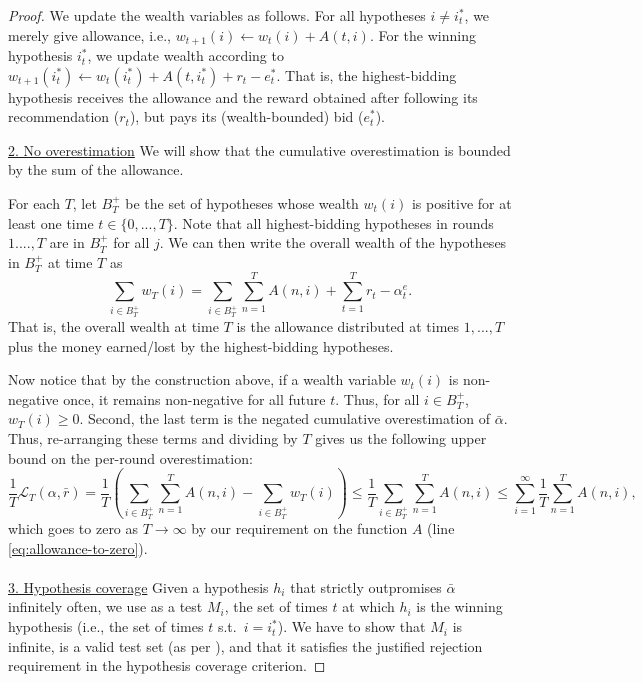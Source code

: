 \documentclass[submission,copyright,creativecommons]{eptcs}
\begin{document}
\begin{proof}
We update the wealth variables as follows. For all hypotheses $i\neq i^*_t$, we merely give allowance, i.e., $w_{t+1}(i) \leftarrow w_t(i) + A(t,i)$.
For the winning hypothesis $i_t^*$, we update wealth according to $w_{t+1}(i_t^*) \leftarrow w_t(i^*_t)
    + A(t,i_t^*)
    + r_t - e^*_t$.
That is, the highest-bidding hypothesis receives the allowance and the reward obtained after following its recommendation ($r_t$), but pays its (wealth-bounded) bid ($e_t^*$).

%
%
%
%

\underline{2. No overestimation} We will show that the cumulative overestimation is bounded by the sum of the allowance.

For each $T$, let $B^+_{T}$ be the set of hypotheses whose wealth $w_t(i)$ is positive for at least one time $t\in\{0,...,T\}$. Note that all highest-bidding hypotheses in rounds $1....,T$ are in $B^+_{T}$ for all $j$. We can then write the overall wealth of the hypotheses in $B^+_{T}$ at time $T$ as
\begin{equation*}
\sum_{i\in B^+_{T}} w_T (i) = \sum_{i\in B^+_{T}} \sum_{n=1}^{T} A(n,i) + \sum_{t=1}^T r_t-\alpha_t^e.
\end{equation*}
That is, the overall wealth at time $T$ is the allowance distributed at times $1,...,T$ plus the money earned/lost by the highest-bidding hypotheses.

Now notice that by the construction above, if a wealth variable $w_t(i)$ is non-negative once, it remains non-negative for all future $t$. Thus, for all $i\in B_{T}^+$, $w_T(i)\geq 0$. 
Second, the last term is the negated cumulative overestimation of $\bar \alpha$. Thus, re-arranging these terms and dividing by $T$ gives us the following upper bound on the per-round overestimation:
\begin{equation*}
\frac{1}{T} \mathcal{L}_T(\alpha,\bar r) = \frac{1}{T}\left(\sum_{i\in B_{T}^+} \sum_{n=1}^{T} A(n,i) - \sum_{i\in B^+_{T}} w_T (i) \right) \leq \frac{1}{T}\sum_{i\in B_{T}^+} \sum_{n=1}^{T} A(n,i) \leq \sum_{i=1}^{\infty} \frac{1}{T} \sum_{n=1}^{T} A(n,i),
\end{equation*}
which goes to zero as $T\rightarrow \infty$ by our requirement on the function $A$ (line \ref{eq:allowance-to-zero}).\\\\

\underline{3. Hypothesis coverage} Given a hypothesis $h_i$ that strictly outpromises $\bar \alpha$ infinitely often, we use as a test $M_i$, the set of times $t$ at which $h_i$ is the winning hypothesis (i.e., the set of times $t$ s.t.\ $i=i_t^*$). We have to show that $M_i$ is infinite, is a valid test set (as per ), and that it satisfies the justified rejection requirement in the hypothesis coverage criterion.
%


\end{proof}
\end{document}
